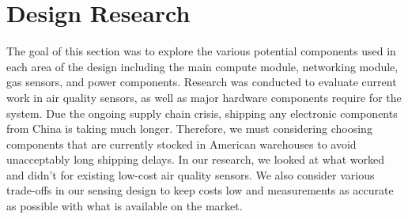 
\section{Design Research}
The goal of this section was to explore the various potential components used in
each area of the design including the main compute module, networking module, gas
sensors, and power components. Research was conducted to evaluate current work 
in air quality sensors, as well as major hardware components require for the 
system. Due the ongoing supply chain crisis, shipping any electronic
components from China is taking much longer. Therefore, we must considering
choosing components that are currently stocked in American warehouses to avoid
unacceptably long shipping delays. In our research, we looked at what worked and
didn't for existing low-cost air quality sensors. We also consider various
trade-offs in our sensing design to keep costs low and measurements as accurate
as possible with what is available on the market. 

